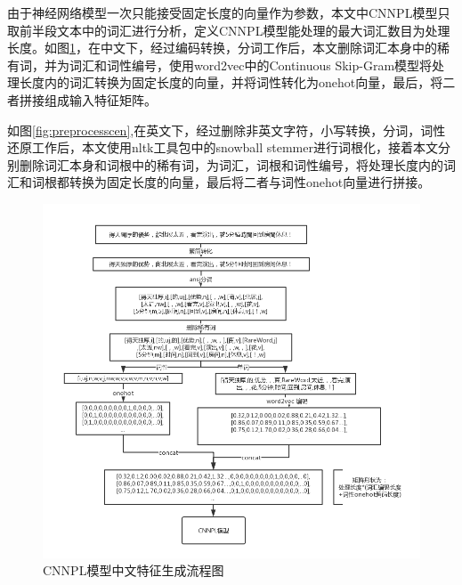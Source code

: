 由于神经网络模型一次只能接受固定长度的向量作为参数，本文中CNNPL模型只取前半段文本中的词汇进行分析，定义CNNPL模型能处理的最大词汇数目为处理长度。如图\ref{fig:preprocessczh}，在中文下，经过编码转换，分词工作后，本文删除词汇本身中的稀有词，并为词汇和词性编号，使用word2vec中的Continuous Skip-Gram模型\cite{mikolov2013b}将处理长度内的词汇转换为固定长度的向量，并将词性转化为onehot向量，最后，将二者拼接组成输入特征矩阵。


如图\ref{fig:preprocesscen},在英文下，经过删除非英文字符，小写转换，分词，词性还原工作后，本文使用nltk工具包中的snowball stemmer进行词根化，接着本文分别删除词汇本身和词根中的稀有词，为词汇，词根和词性编号，将处理长度内的词汇和词根都转换为固定长度的向量，最后将二者与词性onehot向量进行拼接。


\begin{figure}[!htbp]
\begin{center}
\includegraphics[width=\textwidth]{graphic/preprocessczh.png}
\caption{CNNPL模型中文特征生成流程图 \label{fig:preprocessczh}}
\end{center}
\end{figure}



